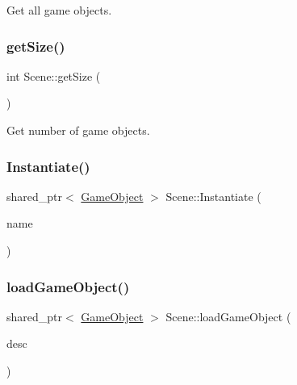 Get all game objects. 

\hypertarget{class_mason_1_1_scene_a97780dbb825e92c62b02623fe1e297fa}{}\label{class_mason_1_1_scene_a97780dbb825e92c62b02623fe1e297fa} 
\subsubsection{\texorpdfstring{get\+Size()}{getSize()}}
{\footnotesize\ttfamily int Scene\+::get\+Size (\begin{DoxyParamCaption}{ }\end{DoxyParamCaption})}



Get number of game objects. 

\hypertarget{class_mason_1_1_scene_a3eee172075ff2b845caffc8e641f9d9c}{}\label{class_mason_1_1_scene_a3eee172075ff2b845caffc8e641f9d9c} 
\subsubsection{\texorpdfstring{Instantiate()}{Instantiate()}}
{\footnotesize\ttfamily shared\+\_\+ptr$<$ \hyperlink{class_mason_1_1_game_object}{Game\+Object} $>$ Scene\+::\+Instantiate (\begin{DoxyParamCaption}\item[{std\+::string}]{name }\end{DoxyParamCaption})\hspace{0.3cm}{\ttfamily [static]}}

\hypertarget{class_mason_1_1_scene_a4d1afc4d112079aedd3829a8a42e902e}{}\label{class_mason_1_1_scene_a4d1afc4d112079aedd3829a8a42e902e} 
\subsubsection{\texorpdfstring{load\+Game\+Object()}{loadGameObject()}}
{\footnotesize\ttfamily shared\+\_\+ptr$<$ \hyperlink{class_mason_1_1_game_object}{Game\+Object} $>$ Scene\+::load\+Game\+Object (\begin{DoxyParamCaption}\item[{\hyperlink{class_mason_1_1_game_object_descriptor}{Game\+Object\+Descriptor}}]{desc }\end{DoxyParamCaption})}



